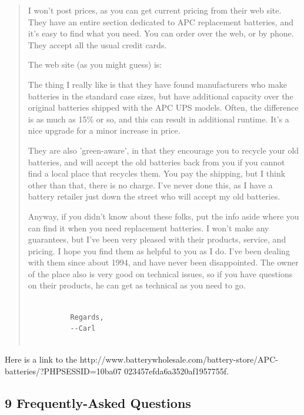 {{{{{{{{{\begin{quote}
I won't post prices, as you can get current pricing from their web site. They
have an entire section dedicated to APC replacement batteries, and it's easy
to find what you need. You can order over the web, or by phone. They accept
all the usual credit cards.  

The web site (as you might guess) is: 

The thing I really like is that they have found manufacturers who make
batteries in the standard case sizes, but have additional capacity over the
original batteries shipped with the APC UPS models. Often, the difference is
as much as 15\% or so, and this can result in additional runtime. It's a nice
upgrade for a minor increase in price.  

They are also 'green-aware', in that they encourage you to recycle your old
batteries, and will accept the old batteries back from you if you cannot find
a local place that recycles them. You pay the shipping, but I think other than
that, there is no charge. I've never done this, as I have a battery retailer
just down the street who will accept my old batteries.  

Anyway, if you didn't know about these folks, put the info aside where you can
find it when you need replacement batteries. I won't make any guarantees, but
I've been very pleased with their products, service, and pricing. I hope you
find them as helpful to you as I do. I've been dealing with them since about
1994, and have never been disappointed. The owner of the place also is very
good on technical issues, so if you have questions on their products, he can
get as technical as you need to go.  

\footnotesize
\begin{verbatim}
          
          Regards,
          --Carl
     
\end{verbatim}
\normalsize

\end{quote}

Here is a link to the 
{http://www.batterywholesale.com/battery-store/APC-batteries/?PHPSESSID=10ba07%
023457efda6a3520af1957755f}. 

\label{Frequently_002dAsked-Questions}

\subsection*{9 Frequently-Asked Questions}

}}}}}}}}}
